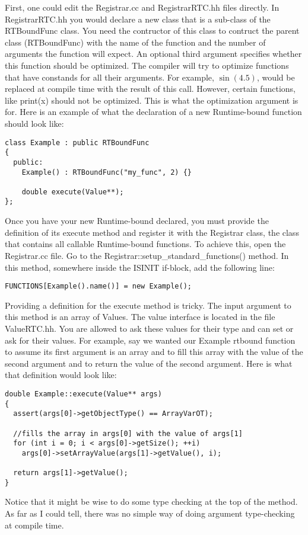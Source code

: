 \documentclass{article}
\begin{document}
\noindent
First, one could edit the Registrar.cc and RegistrarRTC.hh files
directly. In RegistrarRTC.hh you would declare a new class that is a 
sub-class of the RTBoundFunc class. You need the contructor of this class
to contruct the parent class (RTBoundFunc) with the name of the function
and the number of arguments the function will expect. An optional third
argument specifies whether this function should be optimized. The compiler
will try to optimize functions that have constands for all their arguments.
For example, $\sin(4.5)$, would be replaced at compile time with the result 
of this call. However, certain functions, like print(x) should not be
optimized. This is what the optimization argument is for. Here is an example
of what the declaration of a new Runtime-bound function should look like:
{\ttfamily \begin{verbatim}
class Example : public RTBoundFunc
{
  public:
    Example() : RTBoundFunc("my_func", 2) {}
 
    double execute(Value**);
};
\end{verbatim} }
\noindent
Once you have your new Runtime-bound declared, you must provide the definition
of its execute method and register it with the Registrar class, the class that
contains all callable Runtime-bound functions. To achieve this, open the 
Registrar.cc file. Go to the Registrar::setup\_standard\_functions() method.
In this method, somewhere inside the ISINIT if-block, add the following
line:
{\ttfamily \begin{verbatim}
FUNCTIONS[Example().name()] = new Example();
\end{verbatim} }
\noindent
Providing a definition for the execute method is tricky. The input argument
to this method is an array of Values. The value interface is located in
the file ValueRTC.hh. You are allowed to ask these values for their type
and can set or ask for their values. For example, say we wanted our Example
rtbound function to assume its first argument is an array and to fill this
array with the value of the second argument and to return the value of the
second argument. Here is what that definition would look like:
{\ttfamily \begin{verbatim}
double Example::execute(Value** args) 
{
  assert(args[0]->getObjectType() == ArrayVarOT);

  //fills the array in args[0] with the value of args[1]
  for (int i = 0; i < args[0]->getSize(); ++i) 
    args[0]->setArrayValue(args[1]->getValue(), i);

  return args[1]->getValue();
}
\end{verbatim} }
\noindent
Notice that it might be wise to do some type checking at the top of the 
method. As far as I could tell, there was no simple way of doing argument
type-checking at compile time. \\
\end{document}
